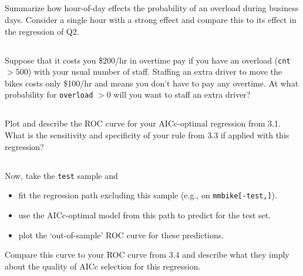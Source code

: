 \documentclass[12pt]{article}
\begin{document}
\subsection{} Summarize how hour-of-day effects the probability of an overload during business days.
Consider a single hour with a strong effect and compare this to its effect in the regression of Q2. 

\subsection{} Suppose that it costs you \$200/hr in overtime pay if you have an overload (\texttt{cnt} $>500$) with your usual number of staff.  Staffing an extra driver to move the bikes costs only \$100/hr and means you don't have to pay any overtime.  At what probability for \texttt{overload} $>0$ will you want to staff an extra driver?  

\subsection{} Plot and describe the ROC curve for your AICc-optimal regression from 3.1.  What is the sensitivity and specificity of your rule from 3.3 if applied with this regression?

\subsection{} Now, take the \texttt{test} sample and
\begin{itemize}
\item fit the regression path excluding this sample (e.g., on \texttt{mmbike[-test,]}).
\item use the AICc-optimal model from this path to predict for the test set.
\item plot the `out-of-sample' ROC curve for these predictions.
\end{itemize}
Compare this curve to your ROC curve from 3.4 and describe what they imply about the quality of AICc selection for this regression.
\end{document}
